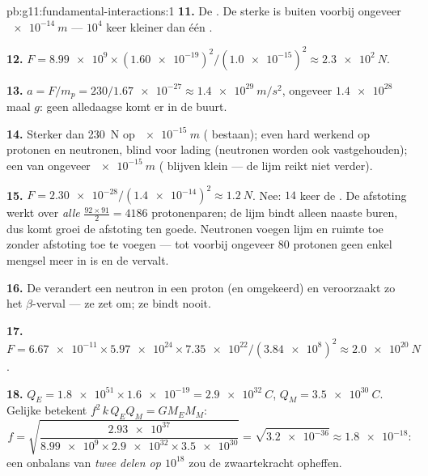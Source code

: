\begin{solution}{pb:g11:fundamental-interactions:1}
\textbf{11.} De . De sterke  is
buiten  voorbij ongeveer $\qty{e-14}{m}$ --- $10^{4}$ keer kleiner
dan één .

\textbf{12.} $F = \num{8.99e9} \times (\num{1.60e-19})^2 /
(\num{1.0e-15})^2 \approx \qty{2.3e2}{N}$.

\textbf{13.} $a = F/m_p = 230/\num{1.67e-27} \approx
\qty{1.4e29}{m/s^2}$, ongeveer $\num{1.4e28}$ maal $g$: geen alledaagse
 komt er in de buurt.

\textbf{14.} Sterker dan \qty{230}{N} op $\qty{e-15}{m}$ (
bestaan); even hard werkend op protonen en neutronen, blind voor lading
(neutronen worden ook vastgehouden); een  van ongeveer
$\qty{e-15}{m}$ ( blijven klein --- de lijm reikt niet verder).

\textbf{15.} $F = \num{2.30e-28}/(\num{1.4e-14})^2 \approx
\qty{1.2}{N}$. Nee: $14$ keer de . De afstoting werkt over
\emph{alle} $\frac{92\times91}{2} = 4186$ protonenparen; de lijm bindt
alleen naaste buren, dus komt groei de afstoting ten goede. Neutronen
voegen lijm en ruimte toe zonder afstoting toe te voegen --- tot voorbij
ongeveer $80$ protonen geen enkel mengsel meer in  is en de 
vervalt.

\textbf{16.} De  verandert een neutron in een proton
(en omgekeerd) en veroorzaakt zo het $\beta$-verval --- ze zet om; ze
bindt nooit.

\textbf{17.} $F = \num{6.67e-11} \times \num{5.97e24} \times
\num{7.35e22}/(\num{3.84e8})^2 \approx \qty{2.0e20}{N}$.

\textbf{18.} $Q_E = \num{1.8e51} \times \num{1.6e-19} =
\qty{2.9e32}{C}$, $Q_M = \qty{3.5e30}{C}$. Gelijke  betekent
$f^2\,k\,Q_E Q_M = G M_E M_M$:
\[
f = \sqrt{\frac{\num{2.93e37}}{\num{8.99e9} \times \num{2.9e32}
\times \num{3.5e30}}} = \sqrt{\num{3.2e-36}} \approx \num{1.8e-18} :
\]
een onbalans van \emph{twee delen op $10^{18}$} zou de zwaartekracht
opheffen.


\end{solution}
